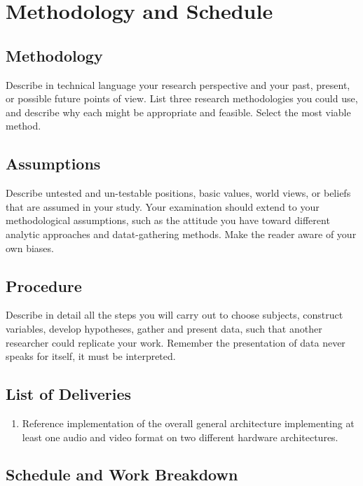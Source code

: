 \chapter{Methodology and Schedule} 
\section{Methodology}
Describe in technical language your research perspective and your past, present, or possible future points of view.
List three research methodologies you could use, and describe why each might be appropriate and feasible. Select the most viable method.

\section{Assumptions}
Describe untested and un-testable positions, basic values, world views, or beliefs that are assumed in your study.
Your examination should extend to your methodological assumptions, such as the attitude you have toward different analytic approaches and datat-gathering methods. Make the reader aware of your own biases.

\section{Procedure}
Describe in detail all the steps you will carry out to choose subjects, construct variables, develop hypotheses, gather and present data, such that another researcher could replicate your work.
Remember the presentation of data never speaks for itself, it must be interpreted.

\section{List of Deliveries}
\begin{enumerate}
\item Reference implementation of the overall general architecture implementing at least one audio and video format on two different hardware architectures.
\end{enumerate}


\section{Schedule and Work Breakdown}
